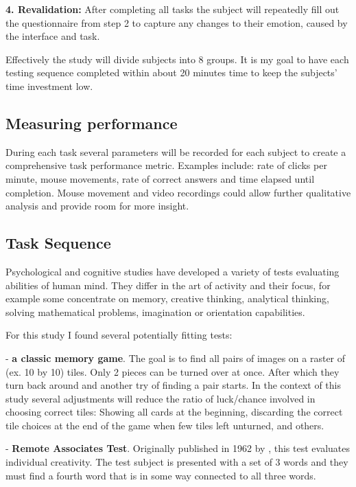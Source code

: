 \textbf{4. Revalidation:} After completing all tasks the subject will repeatedly fill out the questionnaire from step 2 to capture any changes to their emotion, caused by the interface and task.

Effectively the study will divide subjects into 8 groups. 
It is my goal to have each testing sequence completed within about 20 minutes time to keep the subjects' time investment low.

\subsection{Measuring performance} \label{measuring}

During each task several parameters will be recorded for each subject to create a comprehensive task performance metric. 
Examples include: rate of clicks per minute, mouse movements, rate of correct answers and time elapsed until completion. 
Mouse movement and video recordings could allow further qualitative analysis and provide room for more insight.

\subsection{Task Sequence} \label{task_sequence}

Psychological and cognitive studies have developed a variety of tests evaluating abilities of human mind. 
They differ in the art of activity and their focus, for example some concentrate on memory, creative thinking, analytical thinking, solving mathematical problems, imagination or orientation capabilities.

For this study I found several potentially fitting tests:

- \textbf{a classic memory game}. The goal is to find all pairs of images on a raster of (ex. 10 by 10) tiles. 
Only 2 pieces can be turned over at once. 
After which they turn back around and another try of finding a pair starts. 
In the context of this study several adjustments will reduce the ratio of luck/chance involved in choosing correct tiles: Showing all cards at the beginning, discarding the correct tile choices at the end of the game when few tiles left unturned, and others.

- \textbf{Remote Associates Test}. Originally published in 1962 by \cite[p.226 ff]{Mednick1962}, this test evaluates individual creativity. 
The test subject is presented with a set of 3 words and they must find a fourth word that is in some way connected to all three words.

